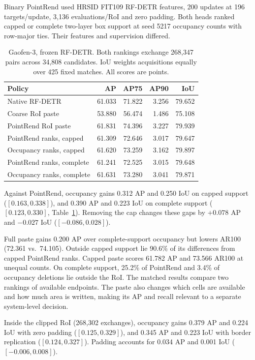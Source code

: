 \documentclass[journal]{IEEEtran}
\begin{document}
Binary PointRend used HRSID FIT109 RF-DETR features, 200 updates at 196 targets/update, 3,136 evaluations/RoI and zero padding. Both heads ranked capped or complete two-layer box support at seed 5217 occupancy counts with row-major ties. Their features and supervision differed.

\begin{table}[t]
\centering
\caption{Gaofen-3, frozen RF-DETR. Both rankings exchange 268,347 pairs across 34,808 candidates. IoU weights acquisitions equally over 425 fixed matches. All scores are points.}
\label{tab:rsdd-pointrend}
\setlength{\tabcolsep}{4pt}
\begin{tabular}{lrrrr}
\toprule
Policy & AP & AP75 & AP90 & IoU\\
\midrule
Native RF-DETR & 61.033 & 71.822 & 3.256 & 79.652\\
Coarse RoI paste & 53.880 & 56.474 & 1.486 & 75.108\\
PointRend RoI paste & 61.831 & 74.396 & 3.227 & 79.939\\
\midrule
PointRend ranks, capped & 61.309 & 72.646 & 3.017 & 79.647\\
Occupancy ranks, capped & 61.620 & 73.259 & 3.162 & 79.897\\
PointRend ranks, complete & 61.241 & 72.525 & 3.015 & 79.648\\
Occupancy ranks, complete & 61.631 & 73.280 & 3.041 & 79.871\\
\bottomrule
\end{tabular}
\end{table}

Against PointRend, occupancy gains 0.312 AP and 0.250 IoU on capped support (\([0.163,0.338]\)), and 0.390 AP and 0.223 IoU on complete support (\([0.123,0.330]\), Table~\ref{tab:rsdd-pointrend}). Removing the cap changes these gaps by \(+0.078\) AP and \(-0.027\) IoU (\([-0.086,0.028]\)).

Full paste gains 0.200 AP over complete-support occupancy but lowers AR100 (72.361 vs.\ 74.105). Outside capped support lie 90.6\% of its differences from capped PointRend ranks. Capped paste scores 61.782 AP and 73.566 AR100 at unequal counts. On complete support, 25.2\% of PointRend and 3.4\% of occupancy deletions lie outside the RoI. The matched results compare two rankings of available endpoints. The paste also changes which cells are available and how much area is written, making its AP and recall relevant to a separate system-level decision.

Inside the clipped RoI (268,302 exchanges), occupancy gains 0.379 AP and 0.224 IoU with zero padding (\([0.125,0.329]\)), and 0.345 AP and 0.223 IoU with border replication (\([0.124,0.327]\)). Padding accounts for 0.034 AP and 0.001 IoU (\([-0.006,0.008]\)).
\end{document}
